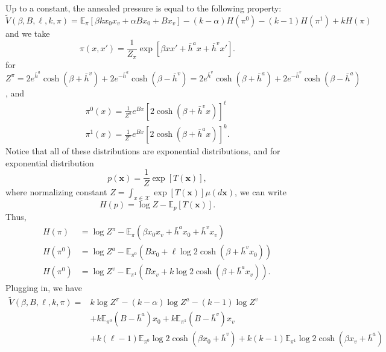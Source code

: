 \documentclass[12pt]{article}
\numberwithin{equation}{section}
\begin{document}
Up to a constant, the annealed pressure is equal to the following property:
\begin{equation*}
    \widetilde{V}(\beta, B, \ell, k, \pi) = \mathbb{E}_{\pi}\left[\beta k x_0 x_v + \alpha Bx_0 + B x_v\right] - (k-\alpha)H(\pi^0) - (k-1)H(\pi^1) + kH(\pi)
\end{equation*}
and we take
\begin{equation*}
    \pi(x, x') = \frac1{Z_\pi} \exp\left[\beta xx' + \bar{h}^a x + \bar{h}^v x'\right].
\end{equation*}
for $Z^\pi = 2e^{\bar{h}^a}\cosh(\beta + \bar{h}^v) + 2e^{-\bar{h}^a}\cosh(\beta - \bar{h}^v) = 2e^{\bar{h}^v}\cosh(\beta + \bar{h}^a) + 2e^{-\bar{h}^v}\cosh(\beta - \bar{h}^a)$,
and
\begin{equation*}
    \begin{aligned}
        \pi^0(x) = \frac1{Z^a}e^{Bx}[2\cosh(\beta + \bar{h}^vx)]^\ell \\
        \pi^1(x) = \frac1{Z^v}e^{Bx}[2\cosh(\beta + \bar{h}^ax)]^k.
    \end{aligned}
\end{equation*}
Notice that all of these distributions are exponential distributions, and for exponential distribution
\begin{equation*}
    p(\mathbf{x}) = \frac1Z \exp[T(\mathbf{x})],
\end{equation*}
where normalizing constant $Z = \int_{x\in\mathcal{X}} \exp[T(\mathbf{x})] \mu(d\mathbf{x})$,
we can write
\begin{equation*}
    H(p) = \log Z - \mathbb{E}_p [T(\mathbf{x})].
\end{equation*}
Thus,
\begin{align*}
    H(\pi)   & = \log Z^\pi - \mathbb{E}_\pi (\beta x_0 x_v + \bar{h}^a x_0 + \bar{h}^v x_v)     \\
    H(\pi^0) & = \log Z^a - \mathbb{E}_{\pi^0} (Bx_0 + \ell \log 2\cosh (\beta + \bar{h}^v x_0)) \\
    H(\pi^0) & = \log Z^v - \mathbb{E}_{\pi^1} (Bx_v + k \log 2\cosh (\beta + \bar{h}^a x_v)).
\end{align*}
Plugging in, we have
\begin{align*}
    \widetilde{V}(\beta, B, \ell, k, \pi) = & k \log Z^\pi - (k-\alpha) \log Z^a - (k-1)\log Z^v                                  \\
                                            & + k\mathbb{E}_{\pi^0} (B - \bar{h}^a) x_0 + k\mathbb{E}_{\pi^1} (B - \bar{h}^v) x_v \\
                                            & + k (\ell - 1) \mathbb{E}_{\pi^0} \log2\cosh(\beta x_0 + \bar{h}^v)
    + k (k - 1) \mathbb{E}_{\pi^1} \log2\cosh(\beta x_v + \bar{h}^a)
\end{align*}
\end{document}
